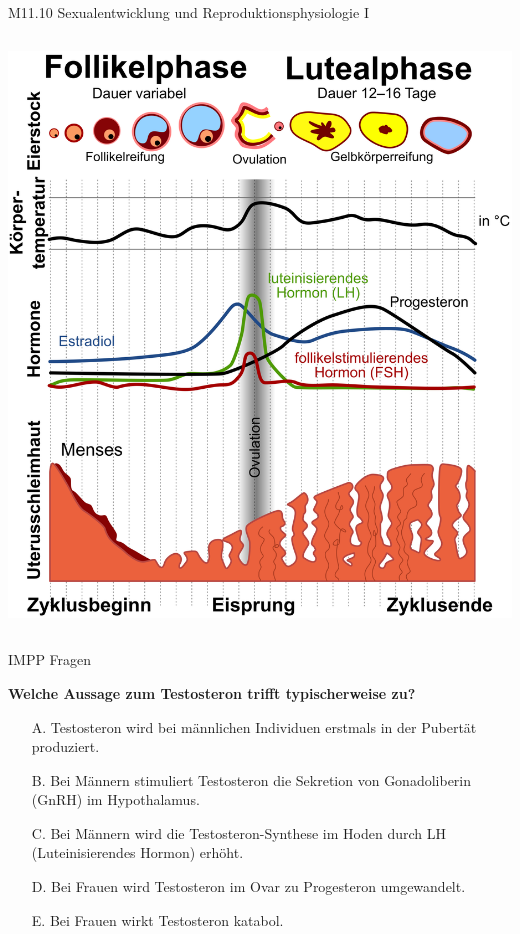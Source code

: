 \documentclass{beamer}
\begin{document}
\begin{frame}{M11.10 Sexualentwicklung und Reproduktionsphysiologie I}
\begin{columns}[t]
\begin{column}{5cm}
\begin{center}
\includegraphics[width=\textwidth]{zyklus.png}
\end{center}


\end{column}


\end{columns}

\end{frame}



\begin{frame}{IMPP Fragen}
    
\textbf{Welche Aussage zum Testosteron trifft typischerweise zu?} \\[0.2 cm]

\begin{itemize}
\item[A.] Testosteron wird bei männlichen Individuen erstmals in der Pubertät produziert.
\item[B.] Bei Männern stimuliert Testosteron die Sekretion von Gonadoliberin (GnRH) im Hypothalamus.
\item[C.] Bei Männern wird die Testosteron-Synthese im Hoden durch LH (Luteinisierendes Hormon) erhöht. %
\item[D.] Bei Frauen wird Testosteron im Ovar zu Progesteron umgewandelt.
\item[E.] Bei Frauen wirkt Testosteron katabol.

\end{itemize}

\end{frame}
\end{document}
